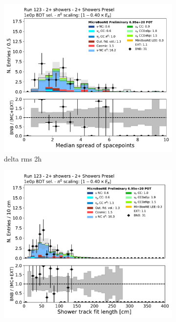 \begin{figure}[H]
    \centering
    \begin{subfigure}{0.3\textwidth}
    \includegraphics[width=1.0\textwidth]{Sidebands/Figures/TwoShr_1e0pSel/BDT/DeltaRMS2h.pdf}
    \caption{delta rms 2h}
    \end{subfigure}
    \begin{subfigure}{0.3\textwidth}
    \includegraphics[width=1.0\textwidth]{Sidebands/Figures/TwoShr_1e0pSel/BDT/shr_trk_len.pdf}

\end{subfigure}
\end{figure}
